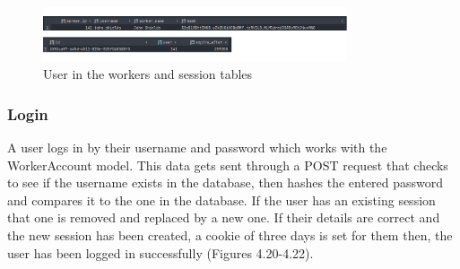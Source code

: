 \begin{figure}[H]
    \caption{User in the workers and session tables}
    \label{image:userinDb}
    \centering
    \includegraphics[width=0.8\textwidth]{images/database/usr_In_db.png}
\end{figure}

\subsubsection{Login}
A user logs in by their username and password which works with the WorkerAccount model. This data gets sent through a POST request that checks to see if the username exists in the database, then hashes the entered password and compares it to the one in the database. If the user has an existing session that one is removed and replaced by a new one. If their details are correct and the new session has been created, a cookie of three days is set for them then, the user has been logged in successfully (Figures 4.20-4.22).

